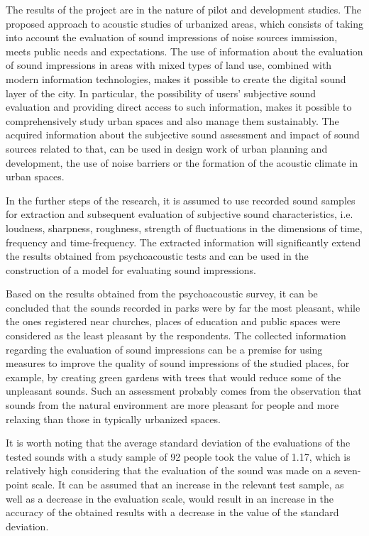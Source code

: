 \documentclass[a4paper,10pt]{article}
\begin{document}
\begin{multicols}{2}
  The results of the project are in the nature of pilot and development studies.
  The proposed approach to acoustic studies of urbanized areas, which consists
  of taking into account the evaluation of sound impressions of noise sources
  immission, meets public needs and expectations. The use of information about
  the evaluation of sound impressions in areas with mixed types of land use,
  combined with modern information technologies, makes it possible to create the
  digital sound layer of the city. In particular, the possibility of users'
  subjective sound evaluation and providing direct access to such information,
  makes it possible to comprehensively study urban spaces and also manage them
  sustainably. The acquired information about the subjective sound assessment
  and impact of sound sources related to that, can be used in design work of
  urban planning and development, the use of noise barriers or the formation of
  the acoustic climate in urban spaces.

  In the further steps of the research, it is assumed to use recorded sound
  samples for extraction and subsequent evaluation of subjective sound
  characteristics, i.e. loudness, sharpness, roughness, strength of fluctuations
  in the dimensions of time, frequency and time-frequency. The extracted
  information will significantly extend the results obtained from psychoacoustic
  tests and can be used in the construction of a model for evaluating sound
  impressions.

  Based on the results obtained from the psychoacoustic survey, it can be
  concluded that the sounds recorded in parks were by far the most pleasant,
  while the ones registered near churches, places of education and public spaces
  were considered as the least pleasant by the respondents. The collected
  information regarding the evaluation of sound impressions can be a premise for
  using measures to improve the quality of sound impressions of the studied
  places, for example, by creating green gardens with trees that would reduce
  some of the unpleasant sounds. Such an assessment probably comes from the
  observation that sounds from the natural environment are more pleasant for
  people and more relaxing than those in typically urbanized spaces.

  It is worth noting that the average standard deviation of the evaluations of
  the tested sounds with a study sample of 92 people took the value of 1.17,
  which is relatively high considering that the evaluation of the sound was made
  on a seven-point scale. It can be assumed that an increase in the relevant
  test sample, as well as a decrease in the evaluation scale, would result in an
  increase in the accuracy of the obtained results with a decrease in the value
  of the standard deviation.


\end{multicols}
\end{document}
